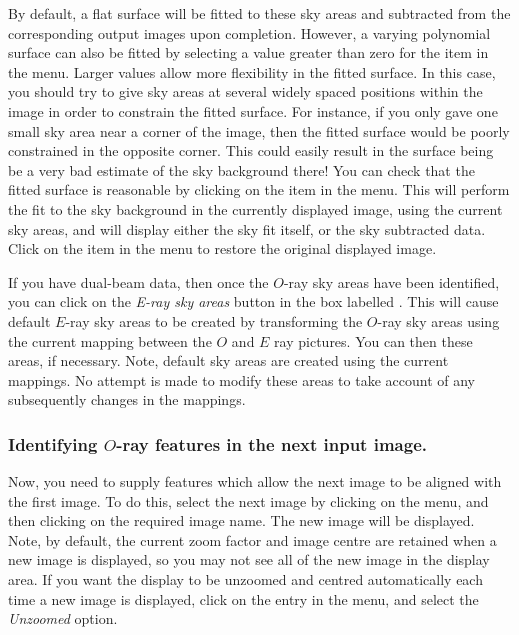 By default, a flat surface will be fitted to these sky areas and
subtracted from the corresponding output images upon completion. However,
a varying polynomial surface can also be fitted by selecting a value
greater than zero for the  item
in the  menu. Larger values
allow more flexibility in the fitted surface. In this case, you should
try to give sky areas at several widely spaced positions within the image
in order to constrain the fitted surface. For instance, if you only gave
one small sky area near a corner of the image, then the fitted surface
would be poorly constrained in the opposite corner. This could easily
result in the surface being be a very bad estimate of the sky background
there! You can check that the fitted surface is reasonable by clicking on
the  item in the
 menu. This will perform
the fit to the sky background in the currently displayed image, using the
current sky areas, and will display either the sky fit itself, or the sky
subtracted data. Click on the 
 item in the 
 menu to restore the original
displayed image.

If you have dual-beam data, then once the $O$-ray sky areas have been
identified, you can click on the {\em E-ray sky areas} button in the box
labelled . This will cause default
$E$-ray sky areas to be created by transforming the $O$-ray sky areas
using the current mapping between the $O$ and $E$ ray pictures. You can
then  these
areas, if necessary. Note, default sky areas are created using the
current mappings. No attempt is made to modify these areas to take
account of any subsequently changes in the mappings.

\subsubsection {Identifying $O$-ray features in the next input image.}
Now, you need to supply features which allow the next image to be
aligned with the first image. To do this, select the next image by
clicking on the  menu, and then
clicking on the required image name. The new image will be displayed.
Note, by default, the current zoom factor and image centre are retained
when a new image is displayed, so you may not see all of the new image in
the display area. If you want the display to be unzoomed and centred
automatically each time a new image is displayed, click on the
 entry in the  menu, and select the {\em Unzoomed} option.

